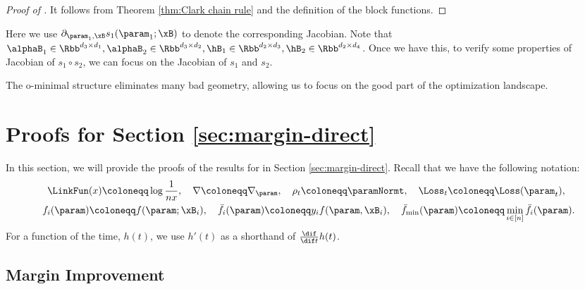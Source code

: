 \begin{proof}[Proof of ]
    It follows from Theorem \ref{thm:Clark chain rule} and the definition of the block functions.
\end{proof}
Here we use $\partial_{\param_1, \xB} s_1 (\param_1;\xB)$ to denote the corresponding Jacobian. Note that $\alphaB_1 \in \Rbb^{d_3 \times d_1}, \alphaB_2 \in \Rbb^{d_3 \times d_2}, \hB_1 \in \Rbb^{d_2 \times d_3}, \hB_2 \in \Rbb^{d_2 \times d_4}$. Once we have this, to verify some properties of Jacobian of $s_1\circ s_2$, we can focus on the Jacobian of $s_1$ and $s_2$. 

The o-minimal structure eliminates many bad geometry, allowing us to focus on the good part of the optimization landscape. 




\section{Proofs for Section \ref{sec:margin-direct}}  \label{sec:proof:margin-direct}
In this section, we will provide the proofs of the results for  in Section \ref{sec:margin-direct}. Recall that we have the following notation: 
\begin{align*}
    \LinkFun(x) \coloneqq  \log \frac{1}{nx}, \quad \nabla  \coloneqq \nabla_{\param} , \quad   
    \rho_t \coloneqq  \paramNormt,\quad  \Loss_t \coloneqq \Loss (\param_t), \quad \\ 
    f_i(\param) \coloneqq f(\param; \xB_i), \quad \bar f_i(\param) \coloneqq y_i f(\param, \xB_i), \quad \bar f_{\min}(\param) \coloneqq \min_{i \in [n]} \bar f_i(\param).
\end{align*}
For a function of the time, $h(t)$, we use $h'(t)$ as a shorthand of $\frac{\dif }{\dif t}h(t)$.



\subsection{Margin Improvement}  \label{sec:proof:margin}

